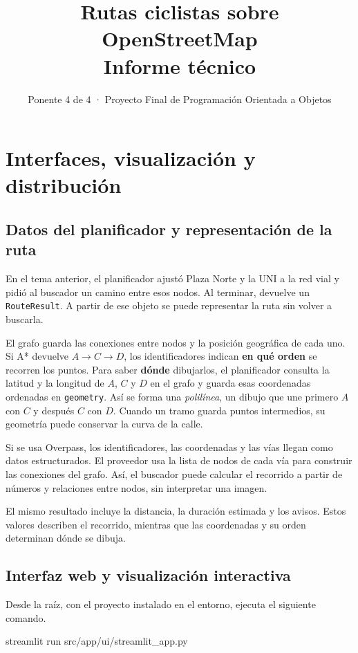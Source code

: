 \documentclass[11pt,a4paper]{article}
\title{Rutas ciclistas sobre OpenStreetMap\\Informe técnico}
\author{Ponente 4 de 4 · Proyecto Final de Programación Orientada a Objetos}
\date{}
\begin{document}
\maketitle
\setcounter{section}{3}
\section{Interfaces, visualización y distribución}

\subsection{Datos del planificador y representación de la ruta}

En el tema anterior, el planificador ajustó Plaza Norte y la UNI a la red vial y pidió al buscador un camino entre esos nodos. Al terminar, devuelve un \texttt{RouteResult}. A partir de ese objeto se puede representar la ruta sin volver a buscarla.

El grafo guarda las conexiones entre nodos y la posición geográfica de cada uno. Si A* devuelve \(A\to C\to D\), los identificadores indican \textbf{en qué orden} se recorren los puntos. Para saber \textbf{dónde} dibujarlos, el planificador consulta la latitud y la longitud de \(A\), \(C\) y \(D\) en el grafo y guarda esas coordenadas ordenadas en \texttt{geometry}. Así se forma una \emph{polilínea}, un dibujo que une primero \(A\) con \(C\) y después \(C\) con \(D\). Cuando un tramo guarda puntos intermedios, su geometría puede conservar la curva de la calle.

Si se usa Overpass, los identificadores, las coordenadas y las vías llegan como datos estructurados. El proveedor usa la lista de nodos de cada vía para construir las conexiones del grafo. Así, el buscador puede calcular el recorrido a partir de números y relaciones entre nodos, sin interpretar una imagen.

El mismo resultado incluye la distancia, la duración estimada y los avisos. Estos valores describen el recorrido, mientras que las coordenadas y su orden determinan dónde se dibuja.

\subsection{Interfaz web y visualización interactiva}
Desde la raíz, con el proyecto instalado en el entorno, ejecuta el siguiente comando.

\begin{Codigo}[numbers=none]
streamlit run src/app/ui/streamlit_app.py
\end{Codigo}
\end{document}
